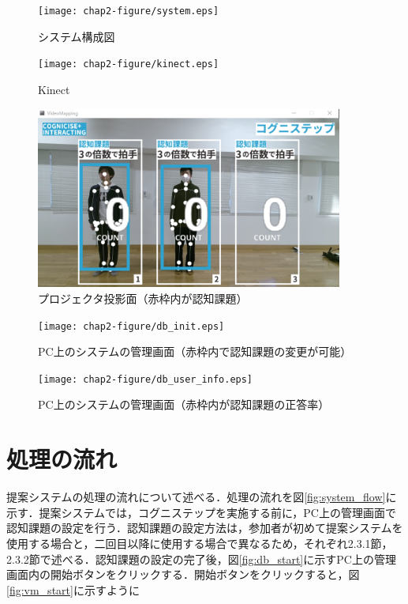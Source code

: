 \begin{figure}[tbp]
	\centering
			\texttt{[image: chap2-figure/system.eps]}
	\caption{システム構成図}
	\label{fig:system}
\end{figure}

\begin{figure}[tbp]
	\centering
			\texttt{[image: chap2-figure/kinect.eps]}
	\caption{Kinect}
	\label{fig:kinect}
\end{figure}
\fi

\begin{figure}[tbp]
	\centering
			\includegraphics[width=0.9\textwidth]{chap2-figure/vm_init.eps}
	\caption{プロジェクタ投影面（赤枠内が認知課題）}
	\label{fig:projection_surface}
\end{figure}

\begin{figure}[tbp]
	\centering
			\texttt{[image: chap2-figure/db\_init.eps]}
	\caption{PC上のシステムの管理画面（赤枠内で認知課題の変更が可能）}
	\label{fig:system_management}
\end{figure}

\begin{figure}[tbp]
	\centering
			\texttt{[image: chap2-figure/db\_user\_info.eps]}
	\caption{PC上のシステムの管理画面（赤枠内が認知課題の正答率）}
	\label{fig:check_answer_rate}
\end{figure}


\section{処理の流れ}
提案システムの処理の流れについて述べる．処理の流れを図\ref{fig:system_flow}に示す．提案システムでは，コグニステップを実施する前に，PC上の管理画面で認知課題の設定を行う．認知課題の設定方法は，参加者が初めて提案システムを使用する場合と，二回目以降に使用する場合で異なるため，それぞれ2.3.1節，2.3.2節で述べる．認知課題の設定の完了後，図\ref{fig:db_start}に示すPC上の管理画面内の開始ボタンをクリックする．開始ボタンをクリックすると，図\ref{fig:vm_start}に示すように

